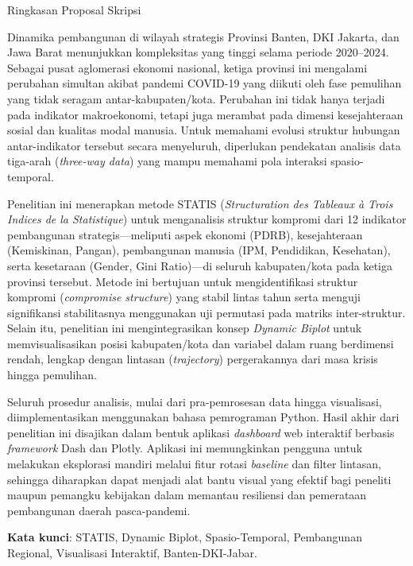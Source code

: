 \documentclass[a4paper]{article}
\theoremstyle{definition} %
\begin{document}
\newpage
\linenumbers
\LARGE
\centerline{Ringkasan Proposal Skripsi}
\vskip1.5cm
\normalsize

Dinamika pembangunan di wilayah strategis Provinsi Banten, DKI Jakarta, dan Jawa Barat menunjukkan kompleksitas yang tinggi selama periode 2020--2024. Sebagai pusat aglomerasi ekonomi nasional, ketiga provinsi ini mengalami perubahan simultan akibat pandemi COVID-19 yang diikuti oleh fase pemulihan yang tidak seragam antar-kabupaten/kota. Perubahan ini tidak hanya terjadi pada indikator makroekonomi, tetapi juga merambat pada dimensi kesejahteraan sosial dan kualitas modal manusia. Untuk memahami evolusi struktur hubungan antar-indikator tersebut secara menyeluruh, diperlukan pendekatan analisis data tiga-arah (\textit{three-way data}) yang mampu memahami pola interaksi spasio-temporal.

Penelitian ini menerapkan metode STATIS (\textit{Structuration des Tableaux à Trois Indices de la Statistique}) untuk menganalisis struktur kompromi dari 12 indikator pembangunan strategis—meliputi aspek ekonomi (PDRB), kesejahteraan (Kemiskinan, Pangan), pembangunan manusia (IPM, Pendidikan, Kesehatan), serta kesetaraan (Gender, Gini Ratio)—di seluruh kabupaten/kota pada ketiga provinsi tersebut. Metode ini bertujuan untuk mengidentifikasi struktur kompromi (\textit{compromise structure}) yang stabil lintas tahun serta menguji signifikansi stabilitasnya menggunakan uji permutasi pada matriks inter-struktur. Selain itu, penelitian ini mengintegrasikan konsep \textit{Dynamic Biplot} untuk memvisualisasikan posisi kabupaten/kota dan variabel dalam ruang berdimensi rendah, lengkap dengan lintasan (\textit{trajectory}) pergerakannya dari masa krisis hingga pemulihan.

Seluruh prosedur analisis, mulai dari pra-pemrosesan data hingga visualisasi, diimplementasikan menggunakan bahasa pemrograman Python. Hasil akhir dari penelitian ini disajikan dalam bentuk aplikasi \textit{dashboard} web interaktif berbasis \textit{framework} Dash dan Plotly. Aplikasi ini memungkinkan pengguna untuk melakukan eksplorasi mandiri melalui fitur rotasi \textit{baseline} dan filter lintasan, sehingga diharapkan dapat menjadi alat bantu visual yang efektif bagi peneliti maupun pemangku kebijakan dalam memantau resiliensi dan pemerataan pembangunan daerah pasca-pandemi.

\bigskip

\noindent\textbf{Kata kunci}: STATIS, Dynamic Biplot, Spasio-Temporal, Pembangunan Regional, Visualisasi Interaktif, Banten-DKI-Jabar.
\end{document}
